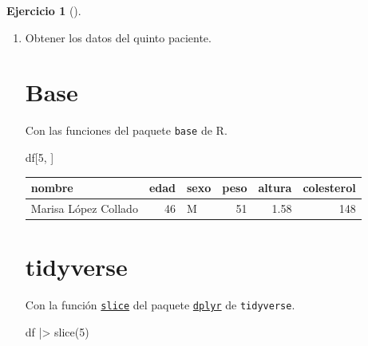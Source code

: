 \documentclass[
  spanish,
  a4paper,
]{scrreport}
\newenvironment{Shaded}{\begin{snugshade}}{\end{snugshade}}
\newcommand{\DecValTok}[1]{\textcolor[rgb]{0.68,0.00,0.00}{#1}}
\newcommand{\FunctionTok}[1]{\textcolor[rgb]{0.28,0.35,0.67}{#1}}
\newcommand{\NormalTok}[1]{\textcolor[rgb]{0.00,0.23,0.31}{#1}}
\newcommand{\SpecialCharTok}[1]{\textcolor[rgb]{0.37,0.37,0.37}{#1}}
\theoremstyle{definition}
\newtheorem{exercise}{Ejercicio}[chapter]
\theoremstyle{remark}
\begin{document}
\begin{exercise}[]
\begin{enumerate}
\begin{tcolorbox}
  \end{tcolorbox}
\item
  Obtener los datos del quinto paciente.

  \begin{tcolorbox}[enhanced jigsaw, titlerule=0mm, arc=.35mm, rightrule=.15mm, opacitybacktitle=0.6, leftrule=.75mm, colframe=quarto-callout-tip-color-frame, toptitle=1mm, breakable, colbacktitle=quarto-callout-tip-color!10!white, bottomrule=.15mm, colback=white, left=2mm, bottomtitle=1mm, opacityback=0, title=\textcolor{quarto-callout-tip-color}{\faLightbulb}\hspace{0.5em}{Solución}, toprule=.15mm, coltitle=black]

  \section{Base}

  Con las funciones del paquete \texttt{base} de R.

\begin{Shaded}
\begin{Highlighting}[]
\NormalTok{df[}\DecValTok{5}\NormalTok{, ]}
\end{Highlighting}
\end{Shaded}

  \begin{longtable}[]{@{}lrlrrr@{}}
  \toprule\noalign{}
  nombre & edad & sexo & peso & altura & colesterol \\
  \midrule\noalign{}
  \endhead
  \bottomrule\noalign{}
  \endlastfoot
  Marisa López Collado & 46 & M & 51 & 1.58 & 148 \\
  \end{longtable}

  \section{tidyverse}

  Con la función
  \href{https://dplyr.tidyverse.org/reference/slice.html}{\texttt{slice}}
  del paquete
  \href{https://dplyr.tidyverse.org/index.html}{\texttt{dplyr}} de
  \texttt{tidyverse}.

\begin{Shaded}
\begin{Highlighting}[]
\NormalTok{df }\SpecialCharTok{|\textgreater{}} \FunctionTok{slice}\NormalTok{(}\DecValTok{5}\NormalTok{)}
\end{Highlighting}
\end{Shaded}


\end{tcolorbox}
\end{enumerate}
\end{exercise}
\end{document}
